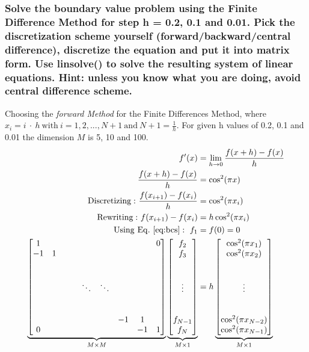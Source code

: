\subsubsection{Solve the boundary value problem using the Finite Difference Method for step h =
0.2, 0.1 and 0.01. Pick the discretization scheme yourself (forward/backward/central
difference), discretize the equation and put it into matrix form. Use linsolve() to solve
the resulting system of linear equations. Hint: unless you know what you are doing,
avoid central difference scheme.}
Choosing the \textit{forward Method} for the Finite Differences Method, where $x_i = i\ \cdot\ h\ \mathrm{with}\ i = 1,2,..., N+1\ \mathrm{and}\ N + 1= \frac{1}{h}$. 
For given h values of 0.2, 0.1 and 0.01 the dimension $M$ is 5, 10 and 100.
\begin{align}
    f'(x) &= \lim\limits_{h \rightarrow 0}{\frac{f(x+h)-f(x)}{h}}\\
    \frac{f(x+h)-f(x)}{h} &= \cos^2(\pi x) \\
    \mathrm{Discretizing:}\ \frac{f(x_{i+1})-f(x_i)}{h} &= \cos^2(\pi x_i)\\
    \mathrm{Rewriting:}\ f(x_{i+1})-f(x_i) &= h\cos^2(\pi x_i)\\
    \mathrm{Using\ Eq.}\ \ref{eq:bcs}:\ f_{1} &= f(0) = 0\\
    \underbrace{\begin{bmatrix}
    1 &   &   &   &   &   &   &   &  0\\
    -1 &  1 &   &   &   &   &   &  & \\
       &    &   &   &   &   &   &   &  \\
       &    &   &   &   &   &   &   &  \\
       &    &   &   &\ddots &\ddots &   &   &  \\
       &    &   &   &   &   &   &   &  \\
       &    &   &   &   &   &   &   &  \\
       &    &   &   &   &   &-1 &  1& \\
     0 &    &   &   &   &   &   &-1 &1\\
    \end{bmatrix}}_{M\times M}
    \underbrace{\begin{bmatrix}
f_2 \\f_3 \\ \\ \\ \vdots\\ \\ \\f_{N-1}\\ f_{N}
\end{bmatrix}}_{M\times 1}&= h \underbrace{\begin{bmatrix}
\cos^2(\pi x_1)\\\cos^2(\pi x_2)\\ \\ \\ \vdots \\ \\ \\\cos^2(\pi x_{N-2})\\\cos^2(\pi x_{N-1})
\end{bmatrix}}_{M\times 1}
\end{align}
